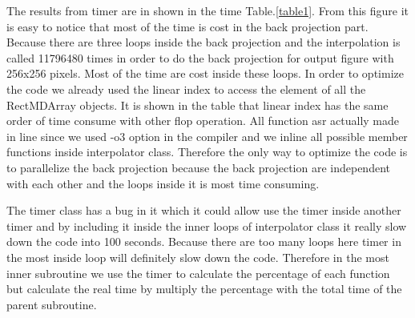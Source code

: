 The results from timer are in shown in the time Table.\ref{table1}. From this figure it is easy to notice that most of the time is cost in the back projection part. Because there are three loops inside the back projection and the interpolation is called 11796480 times in order to do the back projection for output figure with 256x256 pixels. Most of the time are cost inside these loops. In order to optimize the code we already used the linear index to access the element of all the RectMDArray objects. It is shown in the table that linear index has the same order of time consume with other flop operation. All function asr actually made in line since we used -o3 option in the compiler and we inline all possible member functions inside interpolator class. Therefore the only way to optimize the code is to parallelize the back projection because the back projection are independent with each other and the loops inside it is most time consuming.

The timer class has a bug in it which it could allow use the timer inside another timer and by including it inside the inner loops of interpolator class it really slow down the code into 100 seconds. Because there are too many loops here timer in the most inside loop will definitely slow down the code. Therefore in the most inner subroutine we use the timer to calculate the percentage of each function but calculate the real time by multiply the percentage with the total time of the parent subroutine.
